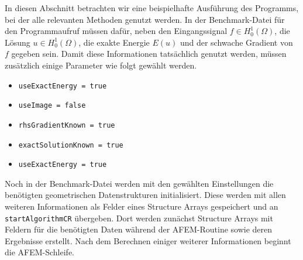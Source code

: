 In diesen Abschnitt betrachten wir eine beispielhafte Ausführung des Programms,
bei der alle relevanten Methoden genutzt werden.
In der Benchmark-Datei für den Programmaufruf müssen dafür, neben den
Eingangssignal $f\in H^1_0(\Omega)$, die Lösung $u\in H^1_0(\Omega)$, die
exakte Energie $E(u)$ und der schwache Gradient von $f$ gegeben sein. 
Damit diese Informationen tatsächlich genutzt werden, müssen zusätzlich einige
Parameter wie folgt gewählt werden.
\begin{itemize}
  \item \texttt{useExactEnergy = true}
  \item \texttt{useImage = false}
  \item \texttt{rhsGradientKnown = true}
  \item \texttt{exactSolutionKnown = true}
  \item \texttt{useExactEnergy = true}
\end{itemize}
Noch in der Benchmark-Datei werden mit den gewählten Einstellungen die
benötigten geometrischen Datenstrukturen initialisiert. 
Diese werden mit allen weiteren Informationen als Felder eines Structure Arrays
gespeichert und an \texttt{startAlgorithmCR} übergeben. 
Dort werden zunächst Structure Arrays mit Feldern für die benötigten Daten
während der AFEM-Routine sowie deren Ergebnisse erstellt. 
Nach dem Berechnen einiger weiterer Informationen beginnt die AFEM-Schleife.

